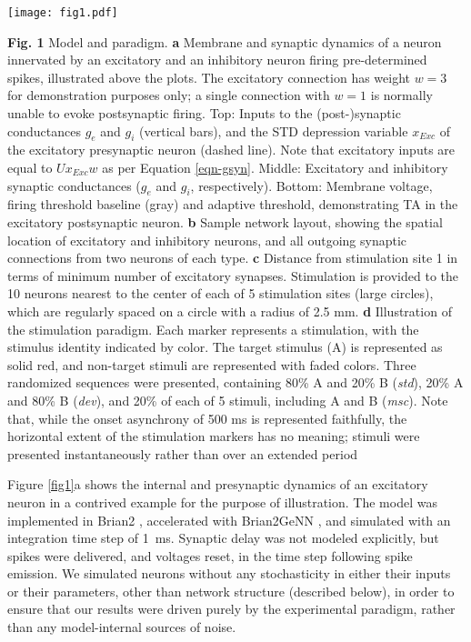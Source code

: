 \documentclass[pdflatex,referee,iicol,sn-basic]{sn-jnl}
\newcommand{\dev}{\textit{dev}}
\newcommand{\msc}{\textit{msc}}
\newcommand{\std}{\textit{std}}
\theoremstyle{thmstyleone}%
\theoremstyle{thmstyletwo}%
\theoremstyle{thmstylethree}%
\begin{document}
\begin{figure*}%
    \centering
    \texttt{[image: fig1.pdf]}
    \caption{}
    \label{fig1}
\end{figure*}
\textbf{Fig. 1} Model and paradigm. \textbf{a} Membrane and synaptic dynamics of a neuron innervated by an excitatory and an inhibitory neuron firing pre-determined spikes, illustrated above the plots. The excitatory connection has weight $w = 3$ for demonstration purposes only; a single connection with $w = 1$ is normally unable to evoke postsynaptic firing. Top: Inputs to the (post-)synaptic conductances $g_e$ and $g_i$ (vertical bars), and the STD depression variable $x_{Exc}$ of the excitatory presynaptic neuron (dashed line). Note that excitatory inputs are equal to $U x_{Exc} w$ as per Equation \ref{eqn-gsyn}. Middle: Excitatory and inhibitory synaptic conductances ($g_e$ and $g_i$, respectively). Bottom: Membrane voltage, firing threshold baseline (gray) and adaptive threshold, demonstrating TA in the excitatory postsynaptic neuron. \textbf{b} Sample network layout, showing the spatial location of excitatory and inhibitory neurons, and all outgoing synaptic connections from two neurons of each type. \textbf{c} Distance from stimulation site 1 in terms of minimum number of excitatory synapses. Stimulation is provided to the 10 neurons nearest to the center of each of 5 stimulation sites (large circles), which are regularly spaced on a circle with a radius of 2.5 mm. \textbf{d} Illustration of the stimulation paradigm. Each marker represents a stimulation, with the stimulus identity indicated by color. The target stimulus (A) is represented as solid red, and non-target stimuli are represented with faded colors. Three randomized sequences were presented, containing 80\% A and 20\% B (\std{}), 20\% A and 80\% B (\dev{}), and 20\% of each of 5 stimuli, including A and B (\msc{}). Note that, while the onset asynchrony of 500 ms is represented faithfully, the horizontal extent of the stimulation markers has no meaning; stimuli were presented instantaneously rather than over an extended period

Figure \ref{fig1}a shows the internal and presynaptic dynamics of an excitatory neuron in a contrived example for the purpose of illustration. The model was implemented in Brian2 \citep{Stimberg2019-tc}, accelerated with Brian2GeNN \citep{Stimberg2020-go}, and simulated with an integration time step of 1~ms. Synaptic delay was not modeled explicitly, but spikes were delivered, and voltages reset, in the time step following spike emission. We simulated neurons without any stochasticity in either their inputs or their parameters, other than network structure (described below), in order to ensure that our results were driven purely by the experimental paradigm, rather than any model-internal sources of noise.
\end{document}
